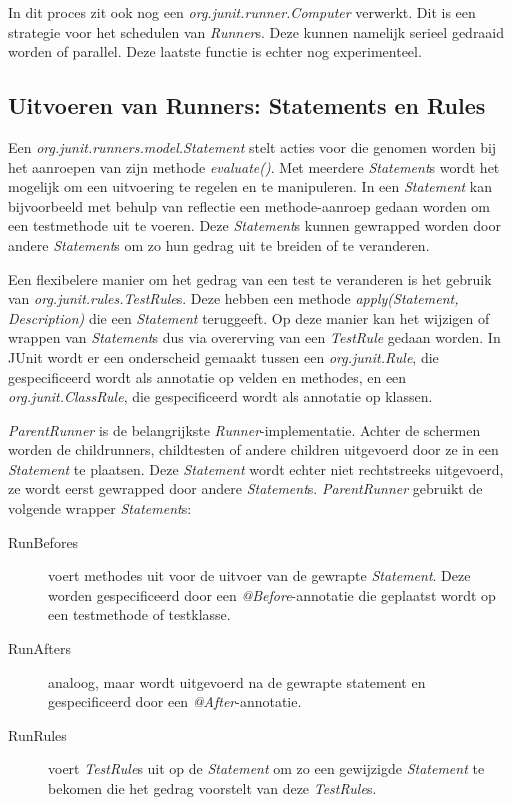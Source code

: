 \documentclass[i1]{oss}
\begin{document}
In dit proces zit ook nog een \emph{org.junit.runner.Computer} verwerkt. Dit is een strategie voor het schedulen van \emph{Runner}s. Deze kunnen namelijk serieel gedraaid worden of parallel. Deze laatste functie is echter nog experimenteel.

\subsection{Uitvoeren van Runners: Statements en Rules}

Een \emph{org.junit.runners.model.Statement} stelt acties voor die genomen worden bij het aanroepen van zijn methode \emph{evaluate()}. Met meerdere \emph{Statement}s wordt het mogelijk om een uitvoering te regelen en te manipuleren. In een \emph{Statement} kan bijvoorbeeld met behulp van reflectie een methode-aanroep gedaan worden om een testmethode uit te voeren. Deze \emph{Statement}s kunnen gewrapped worden door andere \emph{Statement}s om zo hun gedrag uit te breiden of te veranderen.

Een flexibelere manier om het gedrag van een test te veranderen is het gebruik van \emph{org.junit.rules.TestRule}s. Deze hebben een methode \emph{apply(Statement, Description)} die een \emph{Statement} teruggeeft. Op deze manier kan het wijzigen of wrappen van \emph{Statement}s dus via overerving van een \emph{TestRule} gedaan worden. In JUnit wordt er een onderscheid gemaakt tussen een \emph{org.junit.Rule}, die gespecificeerd wordt als annotatie op velden en methodes, en een \emph{org.junit.ClassRule}, die gespecificeerd wordt als annotatie op klassen.

\emph{ParentRunner} is de belangrijkste \emph{Runner}-implementatie. Achter de schermen worden de childrunners, childtesten of andere children uitgevoerd door ze in een \emph{Statement} te plaatsen. Deze \emph{Statement} wordt echter niet rechtstreeks uitgevoerd, ze wordt eerst gewrapped door andere \emph{Statement}s. \emph{ParentRunner} gebruikt de volgende wrapper \emph{Statement}s:

\begin{description}
\item[RunBefores] voert methodes uit voor de uitvoer van de gewrapte \emph{Statement}. Deze worden gespecificeerd door een \emph{@Before}-annotatie die geplaatst wordt op een testmethode of testklasse.
\item[RunAfters] analoog, maar wordt uitgevoerd na de gewrapte statement en gespecificeerd door een \emph{@After}-annotatie.
\item[RunRules] voert \emph{TestRule}s uit op de \emph{Statement} om zo een gewijzigde \emph{Statement} te bekomen die het gedrag voorstelt van deze \emph{TestRule}s.
\end{description}
\end{document}
